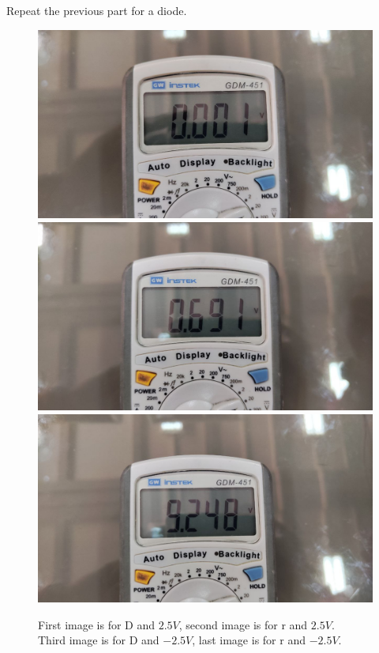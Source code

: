 \documentclass[11pt]{article}
\begin{document}
\begin{question}
\begin{subquestion}{Repeat the previous part for a diode.}
{\begin{figure}[H]
                \includegraphics[scale=0.08,angle=0]{Fig/37.jpeg}
                \includegraphics[scale=0.08,angle=0]{Fig/38.jpeg}
                \includegraphics[scale=0.08,angle=0]{Fig/39.jpeg}
                \caption{First image is for D and $2.5V$, second image is for r and $2.5V$. \\
                \hspace*{14mm} Third image is for D and $-2.5V$, last image is for r and $-2.5V$.}
            \end{figure}

        }
    \end{subquestion}


\end{question}
\end{document}
